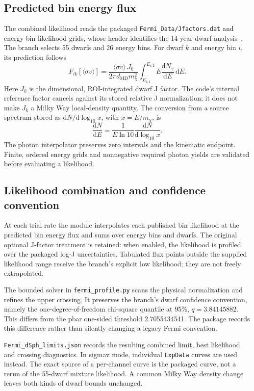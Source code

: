 \documentclass[11pt,a4paper]{article}
\newcommand{\sv}{\langle\sigma v\rangle}
\newcommand{\dd}{\mathrm{d}}
\begin{document}
\subsection{Predicted bin energy flux}
The combined likelihood reads the packaged \texttt{Fermi\_Data/Jfactors.dat} and energy-bin likelihood grids, whose header identifies the 14-year dwarf analysis~\cite{McDaniel2024}. The branch selects 55 dwarfs and 26 energy bins. For dwarf $k$ and energy bin $i$, its prediction follows
\begin{equation}
F_{ik}[\sv]=\frac{\sv\,J_k}{2\pi d_{\mathrm{MD}}m_\chi^2}
\int_{E_{i,1}}^{E_{i,2}}E\frac{\dd N_\gamma}{\dd E}\,\dd E.
\end{equation}
Here $J_k$ is the dimensional, ROI-integrated dwarf J factor. The code's internal reference factor cancels against its stored relative J normalization; it does not make $J_k$ a Milky Way local-density quantity. The conversion from a source spectrum stored as $\dd N/\dd\log_{10}x$, with $x=E/m_\chi$, is
\begin{equation}
\frac{\dd N}{\dd E}=\frac{1}{E\ln10}\frac{\dd N}{\dd\log_{10}x}.
\end{equation}
The photon interpolator preserves zero intervals and the kinematic endpoint. Finite, ordered energy grids and nonnegative required photon yields are validated before evaluating a likelihood.

\subsection{Likelihood combination and confidence convention}
At each trial rate the module interpolates each published bin likelihood at the predicted bin energy flux and sums over energy bins and dwarfs. The original optional J-factor treatment is retained: when enabled, the likelihood is profiled over the packaged log-J uncertainties. Tabulated flux points outside the supplied likelihood range receive the branch's explicit low likelihood; they are not freely extrapolated.

The bounded solver in \texttt{fermi\_profile.py} scans the physical normalization and refines the upper crossing. It preserves the branch's dwarf confidence convention, namely the one-degree-of-freedom chi-square quantile at 95\%, $q=3.84145882$. This differs from the pbar one-sided threshold 2.7055434541. The package records this difference rather than silently changing a legacy Fermi convention.

\texttt{Fermi\_dSph\_limits.json} records the resulting combined limit, best likelihood and crossing diagnostics. In sigmav mode, individual \texttt{ExpData} curves are used instead. The exact source of a per-channel curve is the packaged curve, not a rerun of the 55-dwarf mixture likelihood. A common Milky Way density change leaves both kinds of dwarf bounds unchanged.
\end{document}
